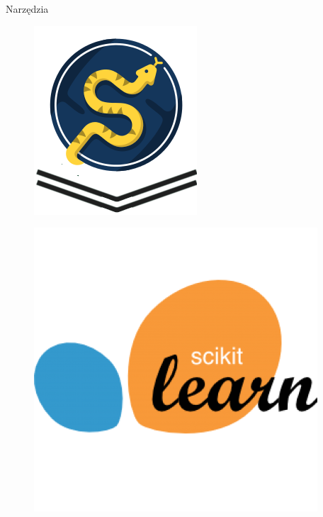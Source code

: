 \documentclass[xcolor=x11names,compress]{beamer}
\renewcommand{\(}{\begin{columns}}
\renewcommand{\)}{\end{columns}}
\newcommand{\<}[1]{\begin{column}{#1}}
\renewcommand{\>}{\end{column}}
\begin{document}
\begin{frame}{Narzędzia}
\begin{itemize}
{                    \begin{figure}
                    \centering
                    \begin{minipage}{.17\textwidth}
                    \includegraphics[width=\linewidth]{scipy.png}
                    \label{fig:test1}
                    \end{minipage}\hfill
                    \begin{minipage}{.2\textwidth}
                    \includegraphics[width=\linewidth]{scikit.png}
                    \label{fig:test2}
                    \end{minipage}\hfill


\end{figure}}
\end{itemize}
\end{frame}
\end{document}
